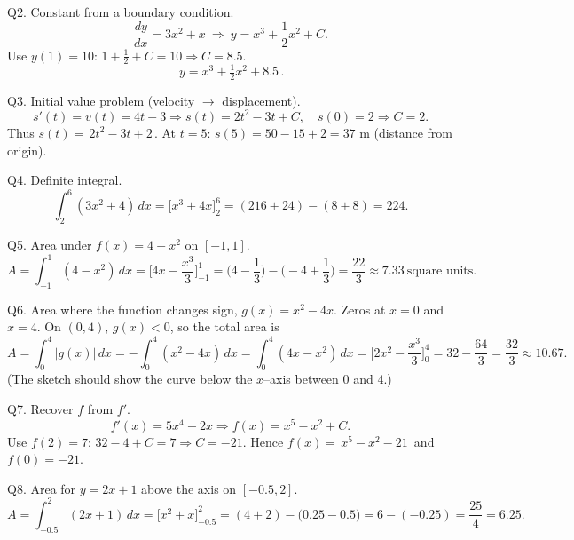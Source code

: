 \documentclass[11pt]{article}
\def\textbf#1{#1}%
\begin{document}
\begin{solution}
\textbf{Q2. Constant from a boundary condition.}
\[
\frac{dy}{dx}=3x^{2}+x \ \Rightarrow\ y=x^{3}+\frac{1}{2}x^{2}+C.
\]
Use $y(1)=10$: $1+\frac12+C=10 \Rightarrow C=8.5$.  
\[
\boxed{\,y=x^{3}+\tfrac12 x^{2}+8.5\, }.
\]
\end{solution}

\begin{solution}
\textbf{Q3. Initial value problem (velocity $\to$ displacement).}
\[
s'(t)=v(t)=4t-3 \Rightarrow s(t)=2t^{2}-3t+C,\quad s(0)=2\Rightarrow C=2.
\]
Thus $s(t)=\boxed{\,2t^{2}-3t+2\,}$.  
At $t=5$: $s(5)=50-15+2=\boxed{37\text{ m}}$ (distance from origin).
\end{solution}

\begin{solution}
\textbf{Q4. Definite integral.}
\[
\int_{2}^{6}(3x^{2}+4)\,dx=\big[x^{3}+4x\big]_{2}^{6}
=(216+24)-(8+8)=\boxed{224}.
\]
\end{solution}

\begin{solution}
\textbf{Q5. Area under $f(x)=4-x^{2}$ on $[-1,1]$.}
\[
A=\int_{-1}^{1}(4-x^{2})\,dx=\Big[4x-\frac{x^{3}}{3}\Big]_{-1}^{1}
=\Big(4-\frac13\Big)-\Big(-4+\frac13\Big)=\boxed{\frac{22}{3}}
\approx \boxed{7.33}\ \text{square units}.
\]
\end{solution}

\begin{solution}
\textbf{Q6. Area where the function changes sign, $g(x)=x^{2}-4x$.}
Zeros at $x=0$ and $x=4$. On $(0,4)$, $g(x)<0$, so the total area is
\[
A=\int_{0}^{4}|g(x)|\,dx=-\int_{0}^{4}(x^{2}-4x)\,dx
=\int_{0}^{4}(4x-x^{2})\,dx=\Big[2x^{2}-\frac{x^{3}}{3}\Big]_{0}^{4}
=32-\frac{64}{3}=\boxed{\frac{32}{3}} \approx 10.67.
\]
(The sketch should show the curve below the $x$–axis between $0$ and $4$.)
\end{solution}

\begin{solution}
\textbf{Q7. Recover $f$ from $f'$.}
\[
f'(x)=5x^{4}-2x \Rightarrow f(x)=x^{5}-x^{2}+C.
\]
Use $f(2)=7$: $32-4+C=7 \Rightarrow C=-21$.  
Hence $f(x)=\boxed{\,x^{5}-x^{2}-21\,}$ and $f(0)=\boxed{-21}$.
\end{solution}

\begin{solution}
\textbf{Q8. Area for $y=2x+1$ above the axis on $[-0.5,2]$.}
\[
A=\int_{-0.5}^{2}(2x+1)\,dx=\big[x^{2}+x\big]_{-0.5}^{2}
=(4+2)-\big(0.25-0.5\big)=6-(-0.25)=\boxed{\frac{25}{4}}=6.25.
\]
\end{solution}
\end{document}
